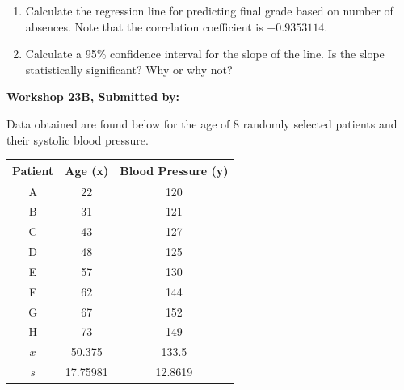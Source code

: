 \documentclass[11pt, chapterprefix=true]{scrbook}\usepackage[]{graphicx}\usepackage[]{color}
\begin{document}
\begin{exercises}
\begin{exercise}
\begin{enumerate}
  \item Calculate the regression line for predicting final grade based on number of absences.  Note that the correlation coefficient is $-0.9353114$. 
  \item Calculate a 95\% confidence interval for the slope of the line.  Is the slope statistically significant?  Why or why not?
\end{enumerate}

\end{exercise}
\begin{solution}  %

\end{solution}

\clearpage

    \begin{exercise}  %

    \begin{center}
\begin{flushleft}\textbf{\large \hfill Workshop 23B, Submitted by: }\end{flushleft}

\end{center}

Data obtained are found below for the age of 8 randomly selected patients and their systolic blood pressure.

\begin{center}
\begin{tabular}{@{} ccc @{}} \hline
Patient &	Age (x)	& Blood Pressure (y) \\ \hline
A&	22&	120 \\
B&	31&	121 \\
C&	43&	127 \\
D&	48&	125 \\
E&	57&	130 \\
F&	62&	144 \\
G&	67&	152 \\
H&	73&	149 \\ \hline
$\bar{x}$ & 50.375 & 133.5 \\
$s$ & 17.75981 & 12.8619 \\ \hline
\end{tabular}
\end{center}


\end{exercise}
\end{exercises}
\end{document}
